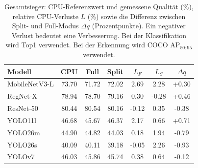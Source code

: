 \begin{table}[!htb]
\centering\small\setlength{\tabcolsep}{3pt}
\caption{Gesamtsieger: CPU-Referenzwert und gemessene Qualität (\%), relative CPU-Verluste $L$ (\%) sowie die Differenz zwischen Split- und Full-Modus $\Delta q$ (Prozentpunkte). Ein negativer Verlust bedeutet eine Verbesserung. Bei der Klassifikation wird Top1 verwendet. Bei der Erkennung wird COCO AP$_{50:95}$ verwendet.}
\label{tab:review:quality}
\begin{tabular*}{\linewidth}{@{\extracolsep{\fill}}l S[table-format=+2.2] S[table-format=+2.2] S[table-format=+2.2] S[table-format=+2.2] S[table-format=+2.2] S[table-format=+1.2]@{}}
\toprule
Modell & {CPU} & {Full} & {Split} & {$L_F$} & {$L_S$} & {$\Delta q$} \\
\midrule
MobileNetV3-L & 73.70 & 71.72 & 72.02 & 2.69 & 2.28 & +0.30 \\
RegNet-X & 78.94 & 78.70 & 79.16 & 0.30 & -0.28 & +0.46 \\
ResNet-50 & 80.44 & 80.54 & 80.16 & -0.12 & 0.35 & -0.38 \\
YOLO11l & 46.68 & 45.67 & 46.37 & 2.17 & 0.66 & +0.71 \\
YOLO26m & 44.90 & 44.82 & 44.03 & 0.18 & 1.94 & -0.79 \\
YOLO26s & 40.09 & 40.11 & 39.18 & -0.05 & 2.26 & -0.93 \\
YOLOv7 & 46.03 & 45.86 & 45.74 & 0.38 & 0.64 & -0.12 \\
\bottomrule\end{tabular*}\end{table}
